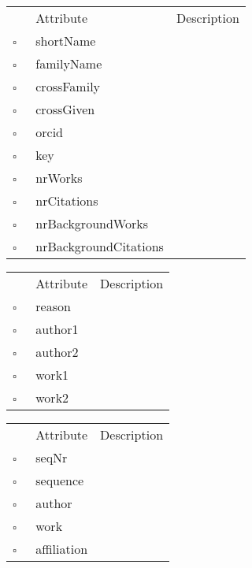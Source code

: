 \begin{table}
\caption{Author  }

\begin{longtable}{llp{8cm}}
& Attribute & Description \\
$\square$\ & shortName &  \\
$\square$\ & familyName &  \\
$\square$\ & crossFamily &  \\
$\square$\ & crossGiven &  \\
$\square$\ & orcid &  \\
$\square$\ & key &  \\
$\square$\ & nrWorks &  \\
$\square$\ & nrCitations &  \\
$\square$\ & nrBackgroundWorks &  \\
$\square$\ & nrBackgroundCitations &  \\
\end{longtable}
\label{attr:Author}
\end{table}

\begin{table}
\caption{AuthorDouble  }

\begin{longtable}{llp{8cm}}
& Attribute & Description \\
$\square$\ & reason &  \\
$\square$\ & author1 &  \\
$\square$\ & author2 &  \\
$\square$\ & work1 &  \\
$\square$\ & work2 &  \\
\end{longtable}
\label{attr:AuthorDouble}
\end{table}

\clearpage
\begin{table}
\caption{Authorship  }

\begin{longtable}{llp{8cm}}
& Attribute & Description \\
$\square$\ & seqNr &  \\
$\square$\ & sequence &  \\
$\square$\ & author &  \\
$\square$\ & work &  \\
$\square$\ & affiliation &  \\
\end{longtable}
\label{attr:Authorship}
\end{table}

